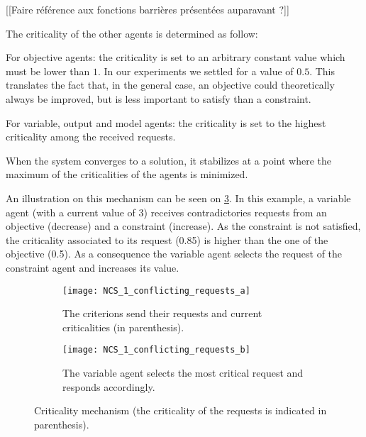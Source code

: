 [[Faire référence aux fonctions barrières présentées auparavant ?]]

\noindent The criticality of the other agents is determined as follow:

\begin{compactitem}
\item For objective agents: the criticality is set to an arbitrary constant value which must be lower than \(1\). In our experiments we settled for a value of \(0.5\). This translates the fact that, in the general case, an objective could theoretically always be improved, but is less important to satisfy than a constraint.
\item For variable, output and model agents: the criticality is set to the highest criticality among the received requests.
\end{compactitem}

When the system converges to a solution, it stabilizes at a point where the maximum of the criticalities of the agents is minimized.

An illustration on this mechanism can be seen on \figurename{} \ref{NCS_1_conflicting_requests}. In this example, a variable agent (with a current value of 3) receives contradictories requests from an objective (decrease) and a constraint (increase). As the constraint is not satisfied, the criticality associated to its request (0.85) is higher than the one of the objective (0.5). As a consequence the variable agent selects the request of the constraint agent and increases its value.

\begin{figure}
	\centering
	\begin{subfigure}[b]{0.45\textwidth}
		\centering
		\texttt{[image: NCS\_1\_conflicting\_requests\_a]}
		\caption{The criterions send their requests and current criticalities (in parenthesis).}\label{NCS_1_conflicting_requests_a}
	\end{subfigure}
	\hfill
	\begin{subfigure}[b]{0.45\textwidth}
		\centering
		\texttt{[image: NCS\_1\_conflicting\_requests\_b]}
		\caption{The variable agent selects the most critical request and responds accordingly.}\label{NCS_1_conflicting_requests_b}
	\end{subfigure}
	
\caption{Criticality mechanism (the criticality of the requests is indicated in parenthesis).}\label{NCS_1_conflicting_requests}
\end{figure}

